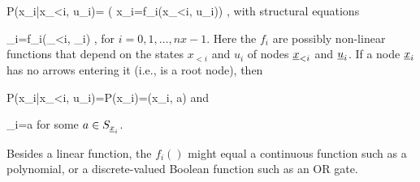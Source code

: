 \beq\color{blue}
P(x_i|x_{<i}, u_i)=
\indi(
x_i=f_i(x_{<i}, u_i))
\;,
\label{eq-nonlinear-pa-tpm}
\eeq
with structural equations

\beq
\rvx_i=f_i(\rvx_{<i}, \rvu_i)
\;,
\label{eq-pa-nonlinear-struc}
\eeq
for $i=0, 1, \ldots, nx-1$.
Here the $f_i$ are 
possibly non-linear
functions
that depend on
the states
$x_{<i}$ and $u_i$
of nodes ${\underline{x}}_{<i}$
and ${\underline{u}}_i$.
If a node ${\underline{x}}_i$
has no arrows
entering it (i.e., is
a root node), then

\beq\color{blue}
P(x_i|x_{<i}, u_i)=P(x_i)=\delta(x_i, a)
\eeq
and

\beq
\rvx_i=a
\eeq
for some $a\in S_{{\underline{x}}_i}$.


Besides a linear function, the
$f_i()$
might equal a
continuous function
such as a polynomial,
or a discrete-valued Boolean
function
such as an OR gate.



